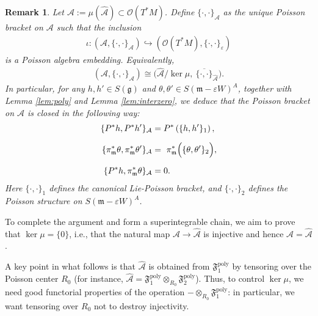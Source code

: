 \documentclass[11pt]{amsart}
\theoremstyle{definition}
\theoremstyle{plain}
\newtheorem{remark}[theorem]{Remark}
\theoremstyle{conclusion}
\begin{document}
\begin{remark}
\label{rem:poisclosed}
  Let $\mathcal{A}:=\mu(\widehat{\mathcal{A}})\subset \mathcal{O}(T^*M)$. Define $\{\cdot ,\cdot \}_{\mathcal{A}}$ as the unique Poisson bracket on $\mathcal{A}$ such that the inclusion \begin{align*}
    \iota: (\mathcal{A},\{\cdot ,\cdot \}_{\mathcal{A}})\hookrightarrow (\mathcal{O}(T^*M),\{\cdot ,\cdot \}_\varepsilon)
\end{align*} is a Poisson algebra embedding. Equivalently, \begin{align*}
  (\mathcal{A},\{\cdot ,\cdot \}_{\mathcal{A}})\cong\bigl(\widehat{\mathcal{A}}/\ker\mu,\ \overline{\{\cdot ,\cdot \}}_{\widehat{\mathcal{A}}}\bigr).  
\end{align*} In particular, for any $h,h'\in S(\mathfrak{g})$ and $\theta,\theta'\in S(\mathfrak{m} - \varepsilon W)^A$, together with Lemma \ref{lem:poly} and Lemma \ref{lem:interzero}, we deduce that the Poisson bracket on $\mathcal{A}$ is closed in the following way:  \begin{align}
\nonumber
    \{P^*h, P^*h'\}_{\mathcal{A}}&=P^*\left(\{h,h'\}_1\right) ,\\[2mm]
\{\pi_{\mathfrak{m}}^*\theta, \pi_{\mathfrak{m}}^*\theta'\}_{\mathcal{A}}&=\ \pi_{\mathfrak{m}}^*\Bigl( \{\theta,\theta'\}_2 \Bigr) ,\\[2mm]
\nonumber
\{P^*h, \pi_{\mathfrak{m}}^*\theta\}_{\mathcal{A}}&=0.
\end{align}   Here $\{\cdot,\cdot\}_1$ defines the canonical Lie-Poisson bracket, and $\{\cdot,\cdot\}_2$ defines the Poisson structure on $S(\mathfrak{m} - \varepsilon W)^A$.
\end{remark}



To complete the argument and form a superintegrable chain, we aim to prove that $\ker \mu = \{0\}$, i.e., that the natural map $\mathcal{A}\to\widehat{\mathcal{A}}$ is injective and hence $\mathcal{A}=\widehat{\mathcal{A}}$.

A key point in what follows is that $\widehat{\mathcal{A}}$ is obtained from $\mathfrak{F}_1^{\mathrm{poly}}$ by tensoring over the Poisson center $R_0$ (for instance, $\widehat{\mathcal{A}} = \mathfrak{F}_1^{\mathrm{poly}}\otimes_{R_0}\mathfrak{F}_2^{\mathrm{poly}}$). Thus, to control $\ker\mu$, we need good functorial properties of the operation $-\otimes_{R_0}\mathfrak{F}_1^{\mathrm{poly}}$: in particular, we want tensoring over $R_0$ not to destroy injectivity.
\end{document}
